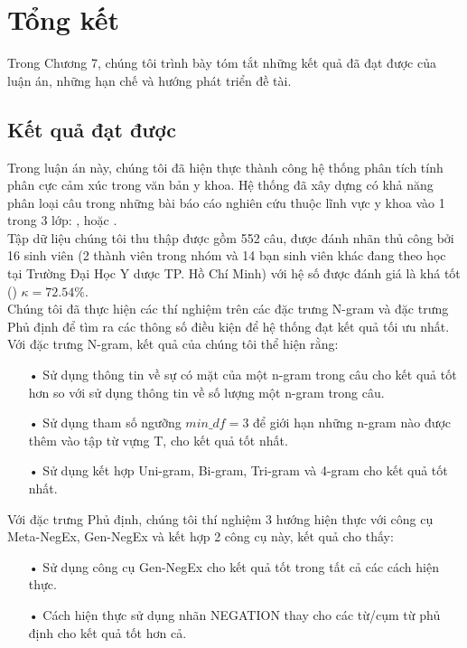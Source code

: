 \chapter{Tổng kết}
\thispagestyle{empty}
Trong Chương 7, chúng tôi trình bày tóm tắt những kết quả đã đạt được của luận án, những hạn chế và hướng phát triển đề tài.
\pagebreak
\section{Kết quả đạt được}
Trong luận án này, chúng tôi đã hiện thực thành công hệ thống phân tích tính phân cực cảm xúc trong văn bản y khoa. Hệ thống đã xây dựng có khả năng phân loại câu trong những bài báo cáo nghiên cứu thuộc lĩnh vực y khoa vào 1 trong 3 lớp: \tichcuc, \tieucuc hoặc \trungtinh. \\

Tập dữ liệu chúng tôi thu thập được gồm 552 câu, được đánh nhãn thủ công bởi 16 sinh viên (2 thành viên trong nhóm và 14 bạn sinh viên khác đang theo học tại Trường Đại Học Y dược TP. Hồ Chí Minh) với hệ số  được đánh giá là khá tốt () $\kappa=72.54\%$.\\

Chúng tôi đã thực hiện các thí nghiệm trên các đặc trưng N-gram và đặc trưng Phủ định để tìm ra các thông số điều kiện để hệ thống đạt kết quả tối ưu nhất. Với đặc trưng N-gram, kết quả của chúng tôi thể hiện rằng:
\begin{itemize}
\item[•] Sử dụng thông tin về sự có mặt của một n-gram trong câu cho kết quả tốt hơn so với sử dụng thông tin về số lượng một n-gram trong câu.
\item[•] Sử dụng tham số ngưỡng $min\_df=3$ để giới hạn những n-gram nào được thêm vào tập từ vựng T, cho kết quả tốt nhất.
\item[•] Sử dụng kết hợp Uni-gram, Bi-gram, Tri-gram và 4-gram cho kết quả tốt nhất.
\end{itemize}
Với đặc trưng Phủ định, chúng tôi thí nghiệm 3 hướng hiện thực với công cụ Meta-NegEx, Gen-NegEx và kết hợp 2 công cụ này, kết quả cho thấy:
\begin{itemize}
\item[•] Sử dụng công cụ Gen-NegEx cho kết quả tốt trong tất cả các cách hiện thực.
\item[•] Cách hiện thực sử dụng nhãn NEGATION thay cho các từ/cụm từ phủ định cho kết quả tốt hơn cả.
\end{itemize}

